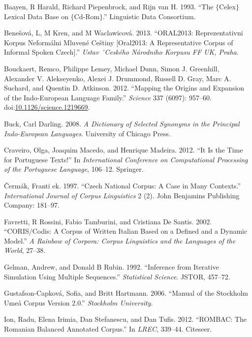 \documentclass[]{article}
\begin{document}
\hypertarget{refs}{}
\hypertarget{ref-baayen1993celex}{}
Baayen, R Harald, Richard Piepenbrock, and Rijn van H. 1993. ``The
\(\{\)Celex\(\}\) Lexical Data Base on \(\{\)Cd-Rom\(\}\).'' Linguistic
Data Consortium.

\hypertarget{ref-benevsova2013oral2013}{}
Benešová, L, M Kren, and M Waclawicová. 2013. ``ORAL2013:
Reprezentativni Korpus Neformálni Mluvené Ceštiny {[}Oral2013: A
Representative Corpus of Informal Spoken Czech{]}.'' \emph{Ustav
ˇCeského Národniho Korpusu FF UK, Praha}.

\hypertarget{ref-bouckaert_mapping_2012}{}
Bouckaert, Remco, Philippe Lemey, Michael Dunn, Simon J. Greenhill,
Alexander V. Alekseyenko, Alexei J. Drummond, Russell D. Gray, Marc A.
Suchard, and Quentin D. Atkinson. 2012. ``Mapping the Origins and
Expansion of the Indo-European Language Family.'' \emph{Science} 337
(6097): 957--60.
doi:\href{https://doi.org/10.1126/science.1219669}{10.1126/science.1219669}.

\hypertarget{ref-buck}{}
Buck, Carl Darling. 2008. \emph{A Dictionary of Selected Synonyms in the
Principal Indo-European Languages}. University of Chicago Press.

\hypertarget{ref-craveiro2012time}{}
Craveiro, Olga, Joaquim Macedo, and Henrique Madeira. 2012. ``It Is the
Time for Portuguese Texts!'' In \emph{International Conference on
Computational Processing of the Portuguese Language}, 106--12. Springer.

\hypertarget{ref-ek1997czech}{}
Čermák, Franti ek. 1997. ``Czech National Corpus: A Case in Many
Contexts.'' \emph{International Journal of Corpus Linguistics} 2 (2).
John Benjamins Publishing Company: 181--97.

\hypertarget{ref-favretti2002coris}{}
Favretti, R Rossini, Fabio Tamburini, and Cristiana De Santis. 2002.
``CORIS/Codis: A Corpus of Written Italian Based on a Defined and a
Dynamic Model.'' \emph{A Rainbow of Corpora: Corpus Linguistics and the
Languages of the World}, 27--38.

\hypertarget{ref-gelman1992inference}{}
Gelman, Andrew, and Donald B Rubin. 1992. ``Inference from Iterative
Simulation Using Multiple Sequences.'' \emph{Statistical Science}.
JSTOR, 457--72.

\hypertarget{ref-gustafson2006manual}{}
Gustafson-Capková, Sofia, and Britt Hartmann. 2006. ``Manual of the
Stockholm Umeå Corpus Version 2.0.'' \emph{Stockholm University}.

\hypertarget{ref-ion2012rombac}{}
Ion, Radu, Elena Irimia, Dan Stefanescu, and Dan Tufis. 2012. ``ROMBAC:
The Romanian Balanced Annotated Corpus.'' In \emph{LREC}, 339--44.
Citeseer.
\end{document}
